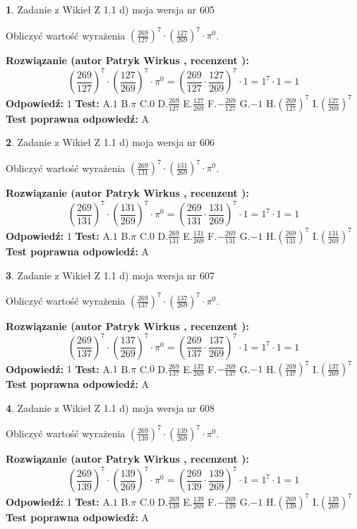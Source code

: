 \documentclass[12pt, a4paper]{article}
\theoremstyle{definition} %
\newtheorem{zad}{}
\newcommand{\zadStart}[1]{\begin{zad}#1\newline}
\newcommand{\zadStop}{\end{zad}}
\newcommand{\rozwStart}[2]{\noindent \textbf{Rozwiązanie (autor #1 , recenzent #2): }\newline}
\newcommand{\rozwStop}{\newline}
\newcommand{\odpStart}{\noindent \textbf{Odpowiedź:}\newline}
\newcommand{\odpStop}{\newline}
\newcommand{\testStart}{\noindent \textbf{Test:}\newline}
\newcommand{\testStop}{\newline}
\newcommand{\kluczStart}{\noindent \textbf{Test poprawna odpowiedź:}\newline}
\newcommand{\kluczStop}{\newline}
\begin{document}
\zadStart{Zadanie z Wikieł Z 1.1 d) moja wersja nr 605}

Obliczyć wartość wyrażenia $(\frac{269}{127})^{7} \cdot (\frac{127}{269})^{7} \cdot \pi^{0}$.
\zadStop
\rozwStart{Patryk Wirkus}{}
$$(\frac{269}{127})^{7} \cdot (\frac{127}{269})^{7} \cdot \pi^{0} = (\frac{269}{127} \cdot \frac{127}{269})^{7} \cdot 1 = 1^{7} \cdot 1 = 1$$
\rozwStop
\odpStart
$1$
\odpStop
\testStart
A.$1$ B.$\pi$ C.$0$ D.$\frac{269}{127}$ E.$\frac{127}{269}$
F.$-\frac{269}{127}$ G.$-1$
H.$(\frac{269}{127})^{7}$
I.$(\frac{127}{269})^{7}$
\testStop
\kluczStart
A
\kluczStop



\zadStart{Zadanie z Wikieł Z 1.1 d) moja wersja nr 606}

Obliczyć wartość wyrażenia $(\frac{269}{131})^{7} \cdot (\frac{131}{269})^{7} \cdot \pi^{0}$.
\zadStop
\rozwStart{Patryk Wirkus}{}
$$(\frac{269}{131})^{7} \cdot (\frac{131}{269})^{7} \cdot \pi^{0} = (\frac{269}{131} \cdot \frac{131}{269})^{7} \cdot 1 = 1^{7} \cdot 1 = 1$$
\rozwStop
\odpStart
$1$
\odpStop
\testStart
A.$1$ B.$\pi$ C.$0$ D.$\frac{269}{131}$ E.$\frac{131}{269}$
F.$-\frac{269}{131}$ G.$-1$
H.$(\frac{269}{131})^{7}$
I.$(\frac{131}{269})^{7}$
\testStop
\kluczStart
A
\kluczStop



\zadStart{Zadanie z Wikieł Z 1.1 d) moja wersja nr 607}

Obliczyć wartość wyrażenia $(\frac{269}{137})^{7} \cdot (\frac{137}{269})^{7} \cdot \pi^{0}$.
\zadStop
\rozwStart{Patryk Wirkus}{}
$$(\frac{269}{137})^{7} \cdot (\frac{137}{269})^{7} \cdot \pi^{0} = (\frac{269}{137} \cdot \frac{137}{269})^{7} \cdot 1 = 1^{7} \cdot 1 = 1$$
\rozwStop
\odpStart
$1$
\odpStop
\testStart
A.$1$ B.$\pi$ C.$0$ D.$\frac{269}{137}$ E.$\frac{137}{269}$
F.$-\frac{269}{137}$ G.$-1$
H.$(\frac{269}{137})^{7}$
I.$(\frac{137}{269})^{7}$
\testStop
\kluczStart
A
\kluczStop



\zadStart{Zadanie z Wikieł Z 1.1 d) moja wersja nr 608}

Obliczyć wartość wyrażenia $(\frac{269}{139})^{7} \cdot (\frac{139}{269})^{7} \cdot \pi^{0}$.
\zadStop
\rozwStart{Patryk Wirkus}{}
$$(\frac{269}{139})^{7} \cdot (\frac{139}{269})^{7} \cdot \pi^{0} = (\frac{269}{139} \cdot \frac{139}{269})^{7} \cdot 1 = 1^{7} \cdot 1 = 1$$
\rozwStop
\odpStart
$1$
\odpStop
\testStart
A.$1$ B.$\pi$ C.$0$ D.$\frac{269}{139}$ E.$\frac{139}{269}$
F.$-\frac{269}{139}$ G.$-1$
H.$(\frac{269}{139})^{7}$
I.$(\frac{139}{269})^{7}$
\testStop
\kluczStart
A
\kluczStop
\end{document}
